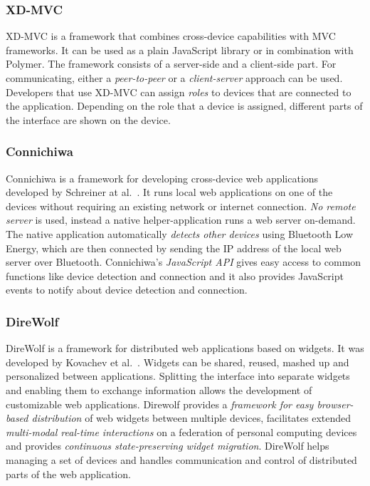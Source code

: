 \subsubsection{XD-MVC}

XD-MVC is a framework that combines cross-device capabilities with MVC frameworks. It can be used as a plain JavaScript library or in combination with Polymer. The framework consists of a server-side and a client-side part. For communicating, either a \emph{peer-to-peer} or a \emph{client-server} approach can be used. Developers that use XD-MVC can assign \emph{roles} to devices that are connected to the application. Depending on the role that a device is assigned, different parts of the interface are shown on the device. 

\subsubsection{Connichiwa}

Connichiwa is a framework for developing cross-device web applications developed by Schreiner at al.~\cite{connichiwa2015}. It runs local web applications on one of the devices without requiring an existing network or internet connection. \emph{No remote server} is used, instead a native helper-application runs a web server on-demand. The native application automatically \emph{detects other devices} using Bluetooth Low Energy, which are then connected by sending the IP address of the local web server over Bluetooth. Connichiwa's \emph{JavaScript API} gives easy access to common functions like device detection and connection and it also provides JavaScript events to notify about device detection and connection.

\subsubsection{DireWolf}

DireWolf is a framework for distributed web applications based on widgets. It was developed by Kovachev et al.~\cite{direwolf2013}. Widgets can be shared, reused, mashed up and personalized between applications. Splitting the interface into separate widgets and enabling them to exchange information allows the development of customizable web applications. Direwolf provides a \emph{framework for easy browser-based distribution} of web widgets between multiple devices, facilitates extended \emph{multi-modal real-time interactions} on a federation of personal computing devices and provides \emph{continuous state-preserving widget migration}. DireWolf helps managing a set of devices and handles communication and control of distributed parts of the web application. 

